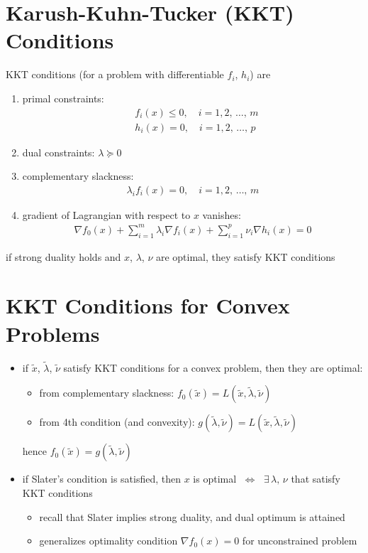 \documentclass[11pt]{extarticle}
\newcommand{\ds}{\displaystyle}
\newcommand{\ifff}{\;\Longleftrightarrow\;}
\theoremstyle{definition}
\begin{document}
\newpage

\section*{Karush-Kuhn-Tucker (KKT) Conditions}
KKT conditions (for a problem with differentiable $f_i$, $h_i$) are
\begin{enumerate}\setlength\itemsep{0em}
  \item primal constraints:
    \begin{align*}
      &f_i(x)\leqslant 0, \quad i = 1, 2,\,\ldots,\,m \\
      &h_i(x) = 0, \quad i = 1, 2,\,\ldots,\,p 
    \end{align*}
  \item dual constraints: $\ds\lambda\succcurlyeq 0$
  \item complementary slackness: 
    \begin{align*}
      \lambda_i f_i(x) = 0,\quad i = 1, 2,\,\ldots,\,m
    \end{align*}
  \item gradient of Lagrangian with respect to $x$ vanishes:
    \begin{align*}
      \nabla f_0(x) + \sum_{i = 1}^m \lambda_i\nabla f_i(x) + \sum_{i = 1}^p \nu_i\nabla h_i(x) = 0 
    \end{align*}
\end{enumerate}
if strong duality holds and $x$, $\lambda$, $\nu$ are optimal, they satisfy KKT conditions

\newpage

\section*{KKT Conditions for Convex Problems}
\begin{itemize}
  \item if $\widetilde{x}$, $\widetilde{\lambda}$, $\widetilde{\nu}$ satisfy KKT conditions for a convex problem, then they are optimal:
    \begin{itemize}
      \item from complementary slackness: $\ds f_0(\widetilde{x}) = L(\widetilde{x}, \widetilde{\lambda}, \widetilde{\nu})$
      \item from 4th condition (and convexity): $\ds g(\widetilde{\lambda},\widetilde{\nu}) = L(\widetilde{x}, \widetilde{\lambda}, \widetilde{\nu})$ 
    \end{itemize}
    hence $\ds f_0(\widetilde{x}) = g(\widetilde{\lambda},\widetilde{\nu})$
  \item if Slater's condition is satisfied, then $x$ is optimal $\ifff$ $\exists\,\lambda,\,\nu$ that satisfy KKT conditions
    \begin{itemize}
      \item recall that Slater implies strong duality, and dual optimum is attained
      \item generalizes optimality condition $\ds\nabla f_0(x) = 0$ for unconstrained problem
    \end{itemize}
\end{itemize}
\end{document}
